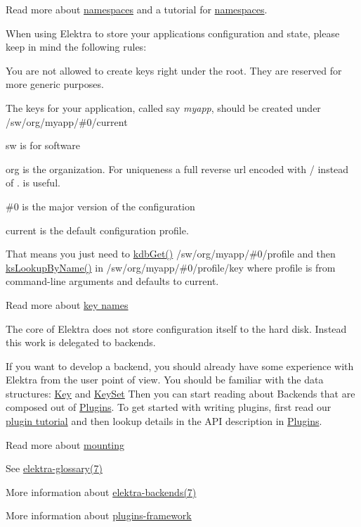 Read more about \hyperlink{doc_help_elektra-namespaces_md}{namespaces} and a tutorial for \hyperlink{doc_tutorials_namespaces_md}{namespaces}.

When using Elektra to store your application\textquotesingle{}s configuration and state, please keep in mind the following rules\+:


\begin{DoxyItemize}
\item You are not allowed to create keys right under the root. They are reserved for more generic purposes.
\item The keys for your application, called say {\itshape myapp}, should be created under {\ttfamily /sw/org/myapp/\#0/current}
\begin{DoxyItemize}
\item sw is for software
\item org is the organization. For uniqueness a full reverse url encoded with \textquotesingle{}/\textquotesingle{} instead of \textquotesingle{}.\textquotesingle{} is useful.
\item {\ttfamily \#0} is the major version of the configuration
\item current is the default configuration profile.
\item That means you just need to \hyperlink{group__kdb_ga28e385fd9cb7ccfe0b2f1ed2f62453a1}{kdb\+Get()} {\ttfamily /sw/org/myapp/\#0/profile} and then \hyperlink{group__keyset_gad65d2cdcbb5381194a1688e169af8a83}{ks\+Lookup\+By\+Name()} in {\ttfamily /sw/org/myapp/\#0/profile/key} where profile is from command-\/line arguments and defaults to current.
\end{DoxyItemize}
\end{DoxyItemize}

Read more about \hyperlink{doc_help_elektra-key-names_md}{key names}

The core of Elektra does not store configuration itself to the hard disk. Instead this work is delegated to backends.

If you want to develop a backend, you should already have some experience with Elektra from the user point of view. You should be familiar with the data structures\+: \hyperlink{group__key}{Key} and \hyperlink{group__keyset}{Key\+Set} Then you can start reading about Backends that are composed out of \hyperlink{group__plugin}{Plugins}. To get started with writing plugins, first read our \hyperlink{doc_tutorials_plugins_md}{plugin tutorial} and then lookup details in the A\+PI description in \hyperlink{group__plugin}{Plugins}.

Read more about \hyperlink{doc_help_elektra-mounting_md}{mounting}


\begin{DoxyItemize}
\item See \hyperlink{doc_help_elektra-glossary_md}{elektra-\/glossary(7)}
\item More information about \hyperlink{doc_help_elektra-backends_md}{elektra-\/backends(7)}
\item More information about \hyperlink{doc_dev_plugins-framework_md}{plugins-\/framework} 
\end{DoxyItemize}